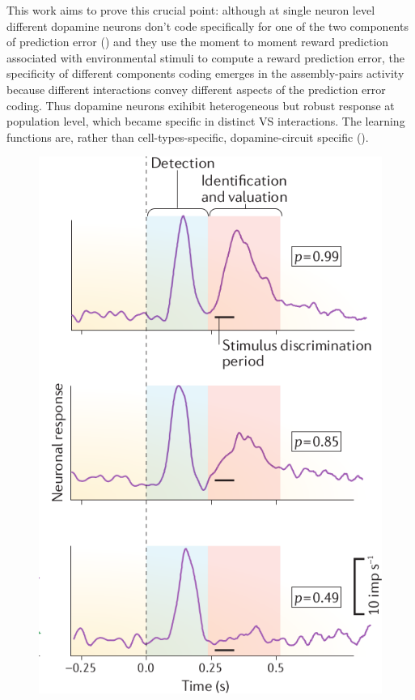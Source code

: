 This work aims to prove this crucial point: although at single neuron level different dopamine neurons don't code specifically for one of the two components of prediction error (\cite{UchidaDop}) and they use the moment to moment reward prediction associated with environmental stimuli to compute a reward prediction error, the specificity of different components coding emerges in the assembly-pairs activity because different interactions convey different aspects of the prediction error coding. Thus dopamine neurons exihibit heterogeneous but robust response at population level, which became specific in distinct VS interactions. The learning functions are, rather than cell-types-specific, dopamine-circuit specific (\cite{Saunders2018}).
\begin{figure}
    \centering
    \includegraphics[scale=0.4]{figures/ResponseProbSchultz.png}

\end{figure}
